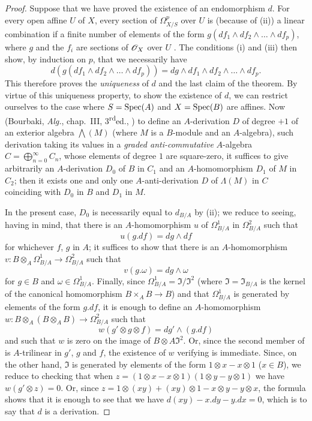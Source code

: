 \begin{proof}
Suppose that we have proved the existence of an endomorphism $d$.
For every open affine $U$ of $X$, every section of $\Omega_{X/S}^p$ over $U$ is (because of \rm{(ii)}) a linear combination if a finite number of elements of the form $g(df_1 \wedge df_2 \wedge \dots \wedge df_p)$, where $g$ and the $f_i$ are sections of $\mathscr{O}_X$ over $U$ .
The conditions \rm{(i)} and \rm{(iii)} then show, by induction on $p$, that we necessarily have
\[
  \label{IV.16.6.2.2}
  d(g(df_1 \wedge df_2 \wedge \dots \wedge df_p)) = dg \wedge df_1 \wedge df_2 \wedge \dots \wedge df_p.
  \tag{16.6.2.2}
\]
This therefore proves the \emph{uniqueness} of $d$ and the last claim of the theorem.
By virtue of this uniqueness property, to show the existence of $d$, we can restrict ourselves to the case where $S = \operatorname{Spec}(A)$ and $X = \operatorname{Spec}(B)$ are affines.
Now (Bourbaki, \emph{Alg.}, chap.~III, 3\textsuperscript{rd}ed., ) to define an $A$-derivation $D$ of degree $+1$ of an exterior algebra $\bigwedge(M)$ (where $M$ is a $B$-module and an $A$-algebra), such derivation taking its values in a \emph{graded anti-commutative} $A$-algebra $C = \bigoplus_{n=0}^\infty C_n$, whose elements of degree $1$ are square-zero, it suffices to give arbitrarily an $A$-derivation  $D_0$ of $B$ in $C_1$ and an $A$-homomorphism $D_1$ of $M$ in $C_2$;
then it exists one and only one $A$-anti-derivation $D$ of $\Lambda(M)$ in $C$ coinciding with $D_0$ in $B$ and $D_1$ in $M$. 

In the present case, $D_0$ is necessarily equal to $d_{B/A}$ by \rm{(ii)};
we reduce to seeing, having  in mind, that there is an $A$-homomorphism $u$ of $\Omega_{B/A}^1$ in $\Omega_{B/A}^2$ such that 
\[
  \label{IV.16.6.2.3}
  u(g.df) = dg \wedge df
  \tag{16.6.2.3}
\]
for whichever $f$, $g$ in $A$;
it suffices to show that there is an $A$-homomorphism $v:B \otimes_A \Omega_{B/A}^1 \to \Omega_{B/A}^2$ such that
\[
  \label{IV.16.6.2.4}
  v(g.\omega) = dg \wedge \omega
  \tag{16.6.2.4}
\]
for $g \in B$ and $\omega \in \Omega_{B/A}^1$.
Finally, since $\Omega_{B/A}^1 = \mathfrak{I}/\mathfrak{I}^2$ (where $\mathfrak{I} = \mathfrak{I}_{B/A}$ is the kernel of the canonical homomorphism $B \times_A B \to B$) and that $\Omega_{B/A}^1$ is generated by elements of the form $g.df$, it is enough to define an $A$-homomorphism $w: B \otimes_A ( B \otimes_A B ) \to \Omega_{B/A}^2$ such that
\[
  \label{IV.16.6.2.5}
  w(g' \otimes g \otimes f) = dg' \wedge (g.df)
  \tag{16.6.2.5}
\]
and such that $w$ is zero on the image of $B \otimes A \mathfrak{I}^2$.
Or, since the second member of  is $A$-trilinear in $g'$, $g$ and $f$, the existence of $w$ verifying  is immediate.
Since, on the other hand, $\mathfrak{I}$ is generated by elements of the form $1 \otimes x - x \otimes 1$ ($x \in B$), we reduce to checking that when $z = (1 \otimes x - x \otimes 1)(1 \otimes y - y \otimes 1)$ we have $w(g'\otimes z) = 0$. 
Or, since $z = 1 \otimes (xy) + (xy) \otimes 1 - x \otimes y - y \otimes x$, the formula  shows that it is 
enough to see that we have $d(xy) - x.dy - y.dx = 0$, which is to say that $d$ is a derivation.


\end{proof}
